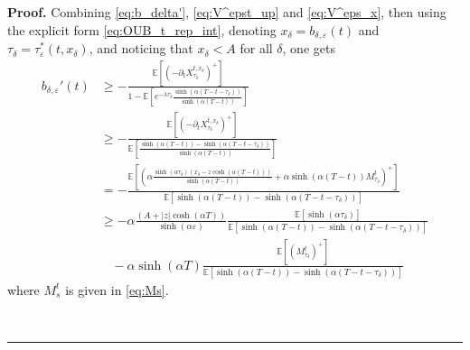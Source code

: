 \documentclass{tufte-handout}
\newcommand{\E}{\mathbb{E}} %
\newenvironment{pf}[1][Proof]{\textbf{#1.} }{\ \rule{0.5em}{0.5em}}
\begin{document}
\begin{pf}
		Combining \eqref{eq:b_delta'}, \eqref{eq:V^epst_up} and \eqref{eq:V^eps_x}, then using the explicit form \eqref{eq:OUB_t_rep_int}, denoting $x_\delta = b_{\delta, \varepsilon}(t)$ and $\tau_\delta = \tau_\varepsilon^*(t, x_\delta)$, and noticing that $x_\delta < A$ for all $\delta$, one gets
		\begin{align}
		b_{\delta, \varepsilon}'(t) &\geq -\displaystyle{\frac{\E\left[\left(-\partial_t X_{\tau_\delta}^{t, x_\delta}\right)^+\right]}{1 - \E\left[e^{-\lambda\tau_\delta}\frac{\sinh(\alpha (T - t - \tau_\delta))}{\sinh(\alpha (T - t))}\right]}} \nonumber \\
		&\geq -\frac{\E\left[\left(-\partial_t X_{\tau_\delta}^{t, x_\delta}\right)^+\right]}{\E\left[\frac{\sinh(\alpha(T - t)) - \sinh(\alpha (T - t - \tau_\delta))}{\sinh(\alpha (T - t))}\right]} \nonumber \\
		&= -\frac{\E\left[\left(\alpha\frac{\sinh(\alpha \tau_\delta)(x_\delta - z\cosh(\alpha(T - t)))}{\sinh(\alpha(T - t))} + \alpha\sinh(\alpha(T - t))M_{\tau_\delta}^t\right)^+\right]}{\E\left[\sinh(\alpha(T - t)) - \sinh(\alpha (T - t - \tau_\delta))\right]} \nonumber \\
		&\geq -\alpha\frac{(A + |z|\cosh(\alpha T))}{\sinh(\alpha\varepsilon)}\frac{\E\left[\sinh(\alpha \tau_\delta)\right]}{\E\left[\sinh(\alpha(T - t)) - \sinh(\alpha (T - t - \tau_\delta))\right]} \nonumber \\
		&\ \ \ \ -\alpha\sinh(\alpha T)\frac{\E\left[\left(M_{\tau_\delta}^t\right)^+\right]}{\E\left[\sinh(\alpha(T - t)) - \sinh(\alpha (T - t - \tau_\delta))\right]} \nonumber
		\end{align}
		where $M_s^t$ is given in \eqref{eq:Ms}.
		

\end{pf}
\end{document}
